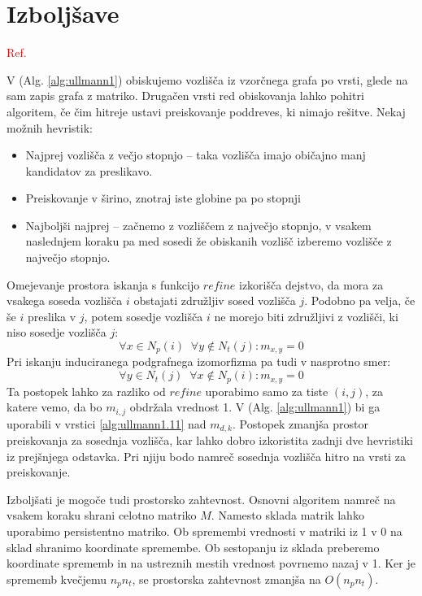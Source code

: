 \documentclass[a4paper, 12pt, ]{book}
\newcommand{\TODO}[1]{\textcolor{red}{#1}}
\newcommand{\refalg}[1]{(Alg. \ref{#1})}
\begin{document}
	\section{Izboljšave}
	\TODO{Ref.}
	
	V \refalg{alg:ullmann1} obiskujemo vozlišča iz vzorčnega grafa po vrsti, glede na sam zapis grafa z matriko. Drugačen vrsti red obiskovanja lahko
	pohitri algoritem, če čim hitreje ustavi preiskovanje poddreves, ki nimajo rešitve. Nekaj možnih hevristik:
	\begin{itemize}
	\item Najprej vozlišča z večjo stopnjo -- taka vozlišča imajo običajno manj kandidatov za preslikavo.
	\item Preiskovanje v širino, znotraj iste globine pa po stopnji
	\item Najboljši najprej -- začnemo z vozliščem z največjo stopnjo, v vsakem naslednjem koraku pa med sosedi že obiskanih vozlišč izberemo vozlišče z
	največjo stopnjo.
	\end{itemize}
	
	Omejevanje prostora iskanja s funkcijo $refine$ izkorišča dejstvo, da mora za vsakega soseda vozlišča $i$ obstajati združljiv sosed vozlišča $j$.
	Podobno pa velja, če še $i$ preslika v $j$, potem sosedje vozlišča $i$ ne morejo biti združljivi z vozlišči, ki niso sosedje vozlišča $j$:
	\begin{equation}
	\label{eq:ullmann_imp1}
	\forall x \in N_p(i) \;\; \forall y \not \in N_t(j) : m_{x,y} = 0
	\end{equation}
	Pri iskanju induciranega podgrafnega izomorfizma pa tudi v nasprotno smer:
	\begin{equation}
	\label{eq:ullmann_imp2}
	\forall y \in N_t(j) \;\; \forall x \not \in N_p(i) : m_{x,y} = 0
	\end{equation}
	Ta postopek lahko za razliko od $refine$ uporabimo samo za tiste $(i, j)$, za katere vemo, da bo $m_{i,j}$ obdržala vrednost 1. V \refalg{alg:ullmann1}
	bi ga uporabili v vrstici \ref{alg:ullmann1.11} nad $m_{d,k}$. Postopek zmanjša prostor preiskovanja za sosednja vozlišča, kar lahko dobro izkoristita 
	zadnji dve hevristiki iz prejšnjega odstavka. Pri njiju bodo namreč sosednja vozlišča hitro na vrsti za preiskovanje.
	
	Izboljšati je mogoče tudi prostorsko zahtevnost. Osnovni algoritem namreč na vsakem koraku shrani celotno matriko $M$. Namesto sklada matrik lahko
	uporabimo persistentno matriko. Ob spremembi vrednosti v matriki iz 1 v 0 na sklad shranimo koordinate spremembe. Ob sestopanju iz sklada
	preberemo koordinate sprememb in na ustreznih mestih vrednost povrnemo nazaj v 1. Ker je sprememb kvečjemu $n_p n_t$, se prostorska
	zahtevnost zmanjša na $O(n_p n_t)$.
\end{document}
